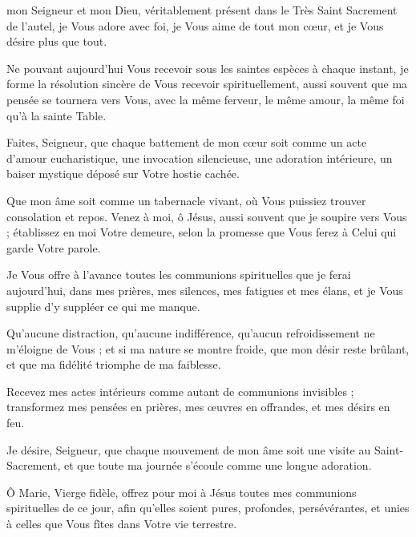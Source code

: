 \culdelampe

 mon Seigneur et mon Dieu, véritablement présent dans le Très Saint Sacrement de l’autel, je Vous adore avec foi, je Vous aime de tout mon cœur, et je Vous désire plus que tout.

Ne pouvant aujourd’hui Vous recevoir sous les saintes espèces à chaque instant, je forme la résolution sincère de Vous recevoir spirituellement, aussi souvent que ma pensée se tournera vers Vous, avec la même ferveur, le même amour, la même foi qu’à la sainte Table.

Faites, Seigneur, que chaque battement de mon cœur soit comme un acte d’amour eucharistique, une invocation silencieuse, une adoration intérieure, un baiser mystique déposé sur Votre hostie cachée.

Que mon âme soit comme un tabernacle vivant, où Vous puissiez trouver consolation et repos. Venez à moi, ô Jésus, aussi souvent que je soupire vers Vous ; établissez en moi Votre demeure, selon la promesse que Vous ferez à Celui qui garde Votre parole.

Je Vous offre à l’avance toutes les communions spirituelles que je ferai aujourd’hui, dans mes prières, mes silences, mes fatigues et mes élans, et je Vous supplie d’y suppléer ce qui me manque.

Qu’aucune distraction, qu’aucune indifférence, qu’aucun refroidissement ne m’éloigne de Vous ; et si ma nature se montre froide, que mon désir reste brûlant, et que ma fidélité triomphe de ma faiblesse.

Recevez mes actes intérieurs comme autant de communions invisibles ; transformez mes pensées en prières, mes œuvres en offrandes, et mes désirs en feu.

Je désire, Seigneur, que chaque mouvement de mon âme soit une visite au Saint-Sacrement, et que toute ma journée s’écoule comme une longue adoration.

Ô Marie, Vierge fidèle, offrez pour moi à Jésus toutes mes communions spirituelles de ce jour, afin qu’elles soient pures, profondes, persévérantes, et unies à celles que Vous fîtes dans Votre vie terrestre.

\culdelampe

